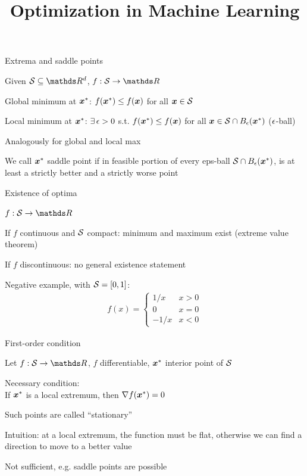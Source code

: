 \documentclass[11pt,compress,t,notes=noshow, xcolor=table]{beamer}
\title{Optimization in Machine Learning}
\begin{document}

\begin{framei}{Extrema and saddle points}
\item Given $\S \subseteq \R^d$, $f: \S \to \R$
\item Global minimum at $\xvs$: $\fxvs \le \fx$ for all $\xv \in \S$
\item Local minimum at $\xvs$: $\exists\, \eps > 0$ s.t. $\fxvs \le \fx$ for all $\xv \in \S \cap B_\eps(\xvs)$ ($\eps$-ball)
\item Analogously for global and local max
\item We call $\xvs$ saddle point if in feasible portion of every eps-ball
$\S \cap B_\eps(\xvs)$, is at least a strictly better and a strictly worse point
\vfill
{}
\end{framei}

\begin{framei}{Existence of optima}
\item $f: \S \to \R$
\item If $f$ continuous and $\S$ compact: minimum and maximum exist (extreme value theorem)
\item If $f$ discontinuous: no general existence statement
\item Negative example, with $\S = [0,1]$:
\begin{align*}
f(x) = \begin{cases}
1/x  & x > 0 \\
0    & x = 0 \\
-1/x & x < 0
\end{cases}
\end{align*}
\end{framei}


\begin{framei}{First-order condition}
\item Let $f: \S \to \R$, $f$ differentiable, $\xvs$ interior point of $\S$
\item Necessary condition:\\
If $\xvs$ is a local extremum, then $\nabla \fxvs = 0$
\item Such points are called ``stationary''
\item Intuition: at a local extremum, the function must be flat, otherwise we can find a direction to move to a better value
\item Not sufficient, e.g. saddle points are possible
\vfill
{}
\end{framei}
\end{document}
